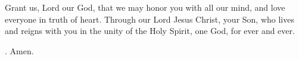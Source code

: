 \lettrine[lines=3]{G}{}rant us, Lord our God,
that we may honor you with all our mind,
and love everyone in truth of heart.
Through our Lord Jesus Christ, your Son,
who lives and reigns with you in the unity of the Holy Spirit,
one God, for ever and ever. \par \Rbar. Amen.
